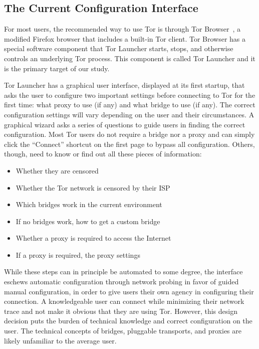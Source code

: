 \documentclass[USenglish,oneside,twocolumn]{article}
\begin{document}
\subsection{The Current Configuration Interface} 

For most users, the recommended way to use Tor is through Tor Browser~\cite{torbrowser},
a modified Firefox browser that includes a built-in Tor client.
Tor Browser has a special software component that
Tor Launcher starts, stops, and otherwise controls
an underlying Tor process.
This component is called Tor Launcher
and it is the primary target of our study.

Tor Launcher has a graphical user interface,
displayed at its first startup, that asks the user
to configure two important settings before connecting to Tor
for the first time:
what proxy to use (if any) and what bridge to use (if any).
The correct configuration settings will vary depending
on the user and their circumstances.
A graphical wizard asks a series of questions to guide
users in finding the correct configuration.
Most Tor users do not require a bridge nor a proxy and
can simply click the ``Connect'' shortcut on
the first page to bypass all configuration.
Others, though, need to know or find out
all these pieces of information:

\begin{itemize}
	\item{Whether they are censored} 
	\item{Whether the Tor network is censored by their ISP}
	\item{Which bridges work in the current environment} 
	\item{If no bridges work, how to get a custom bridge} 
	\item{Whether a proxy is required to access the Internet}
	\item{If a proxy is required, the proxy settings}
\end{itemize}

While these steps can in principle be automated to some degree,
the interface eschews automatic configuration through network probing
in favor of guided manual configuration,
in order to give users their own agency in configuring their connection.
A knowledgeable user can connect while minimizing their network trace
and not make it obvious that they are using Tor.
However, this design decision puts the burden of technical knowledge and correct configuration on the user.
The technical concepts of bridges, pluggable transports, and proxies are likely unfamiliar to the average user.
\end{document}
